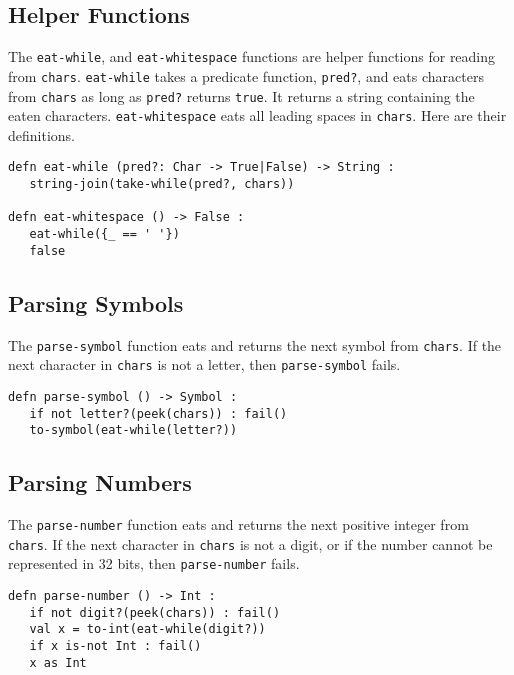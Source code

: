 \documentclass[10pt,oneside]{book}
\begin{document}
\subsection*{Helper Functions}
The \texttt{\frenchspacing eat-while}, and \texttt{\frenchspacing eat-whitespace} functions are helper functions for reading from \texttt{\frenchspacing chars}. \texttt{\frenchspacing eat-while} takes a predicate function, \texttt{\frenchspacing pred?}, and eats characters from \texttt{\frenchspacing chars} as long as \texttt{\frenchspacing pred?} returns \texttt{\frenchspacing true}. It returns a string containing the eaten characters. \texttt{\frenchspacing eat-whitespace} eats all leading spaces in \texttt{\frenchspacing chars}. Here are their definitions.

\begin{lstlisting}
defn eat-while (pred?: Char -> True|False) -> String :
   string-join(take-while(pred?, chars))

defn eat-whitespace () -> False :
   eat-while({_ == ' '})
   false
\end{lstlisting}

\subsection*{Parsing Symbols}
The \texttt{\frenchspacing parse-symbol} function eats and returns the next symbol from \texttt{\frenchspacing chars}. If the next character in \texttt{\frenchspacing chars} is not a letter, then \texttt{\frenchspacing parse-symbol} fails.
\begin{lstlisting}
defn parse-symbol () -> Symbol :
   if not letter?(peek(chars)) : fail()
   to-symbol(eat-while(letter?))
\end{lstlisting}

\subsection*{Parsing Numbers}
The \texttt{\frenchspacing parse-number} function eats and returns the next positive integer from \texttt{\frenchspacing chars}. If the next character in \texttt{\frenchspacing chars} is not a digit, or if the number cannot be represented in 32 bits, then \texttt{\frenchspacing parse-number} fails. 
\begin{lstlisting}
defn parse-number () -> Int :
   if not digit?(peek(chars)) : fail()
   val x = to-int(eat-while(digit?))
   if x is-not Int : fail()
   x as Int
\end{lstlisting}
\end{document}
